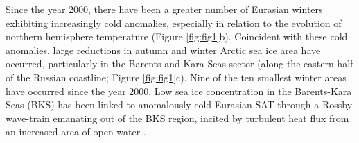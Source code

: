 \documentclass{nature}
\begin{document}



Since the year 2000, there have been a greater number of Eurasian winters exhibiting increasingly cold anomalies, especially in relation to the evolution of northern hemisphere temperature (Figure \ref{fig:fig1}b). Coincident with these cold anomalies, large reductions in autumn and winter Arctic sea ice area have occurred, particularly in the Barents and Kara Seas sector (along the eastern half of the Russian coastline; Figure \ref{fig:fig1}c). Nine of the ten smallest winter areas have occurred since the year 2000. Low sea ice concentration in the Barents-Kara Seas (BKS) has been linked to anomalously cold Eurasian SAT through a Rossby wave-train emanating out of the BKS region, incited by turbulent heat flux from an increased area of open water \cite{honda09,petoukhov10,mori14,kim14,peings14}.  %
\end{document}
